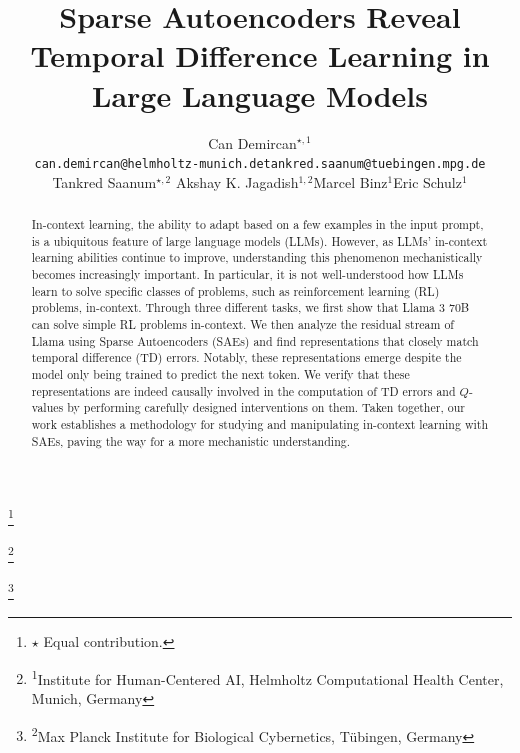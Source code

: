\documentclass{article} %
\title{Sparse Autoencoders Reveal Temporal Difference Learning in Large Language Models}
\author{\hspace{1.5cm}Can Demircan$^{\star, 1}$\\ \hspace{1.5cm}\scriptsize{\texttt{can.demircan@helmholtz-munich.de}}\hspace{1.29cm}\scriptsize{\texttt{tankred.saanum@tuebingen.mpg.de}}  \And \hspace{-6.5cm}Tankred Saanum$^{\star, 2}$ \AND Akshay K. Jagadish$^{1, 2}$\And Marcel Binz$^{1}$\And Eric Schulz$^{1}$}
\newcommand\blfootnote[1]{%
  \begingroup
  \renewcommand\thefootnote{}\footnote{#1}%
  \addtocounter{footnote}{-1}%
  \endgroup
}
\begin{document}
\maketitle

\begin{abstract}
In-context learning, the ability to adapt based on a few examples in the input prompt, is a ubiquitous feature of large language models (LLMs). However, as LLMs' in-context learning abilities continue to improve, understanding this phenomenon mechanistically becomes increasingly important. In particular, it is not well-understood how LLMs learn to solve specific classes of problems, such as reinforcement learning (RL) problems, in-context. Through three different tasks, we first show that Llama $3$ $70$B can solve simple RL problems in-context. We then analyze the residual stream of Llama using Sparse Autoencoders (SAEs) and find representations that closely match temporal difference (TD) errors. Notably, these representations emerge despite the model only being trained to predict the next token. We verify that these representations are indeed causally involved in the computation of TD errors and $Q$-values by performing carefully designed interventions on them. Taken together, our work establishes a methodology for studying and manipulating in-context learning with SAEs, paving the way for a more mechanistic understanding.






\end{abstract}

\blfootnote{$\star$ Equal contribution.}
\blfootnote{\textsuperscript{1}Institute for Human-Centered AI, Helmholtz Computational Health Center, Munich, Germany}
\blfootnote{\textsuperscript{2}Max Planck Institute for Biological Cybernetics, Tübingen, Germany}
\end{document}
